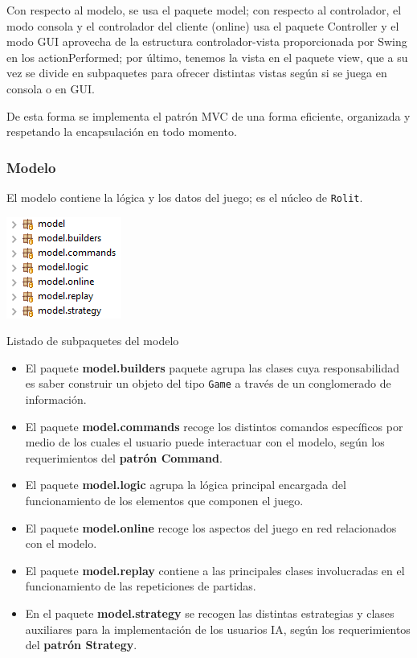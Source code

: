 \documentclass[../DocumentoOficial.tex]{subfiles}
\begin{document}
Con respecto al modelo, se usa el paquete model; con respecto al controlador, el modo consola y el controlador del cliente (online) usa el paquete Controller y el modo GUI aprovecha de la estructura controlador-vista proporcionada por Swing en los actionPerformed; por último, tenemos la vista en el paquete view, que a su vez se divide en subpaquetes para ofrecer distintas vistas según si se juega en consola o en GUI.

De esta forma se implementa el patrón MVC de una forma eficiente, organizada y respetando la encapsulación en todo momento.

\subsubsection{Modelo}

El modelo contiene la lógica y los datos del juego; es el núcleo de \texttt{Rolit}.

\begin{center}
\includegraphics[scale=1.5]{modelpaquetes.png}

Listado de subpaquetes del modelo
\end{center}

\begin{itemize}

\item El paquete \textbf{model.builders} paquete agrupa las clases cuya responsabilidad es saber construir un objeto del tipo \texttt{Game} a través de un conglomerado de información.

\item El paquete \textbf{model.commands} recoge los distintos comandos específicos por medio de los cuales el usuario puede interactuar con el modelo, según los requerimientos del \textbf{patrón Command}.

\item El paquete \textbf{model.logic} agrupa la lógica principal encargada del funcionamiento de los elementos que componen el juego.

\item El paquete \textbf{model.online} recoge los aspectos del juego en red relacionados con el modelo.

\item El paquete \textbf{model.replay} contiene a las principales clases involucradas en el funcionamiento de las repeticiones de partidas.

\item En el paquete \textbf{model.strategy} se recogen las distintas estrategias y clases auxiliares para la implementación de los usuarios IA, según los requerimientos del \textbf{patrón Strategy}.

\end{itemize}
\end{document}
